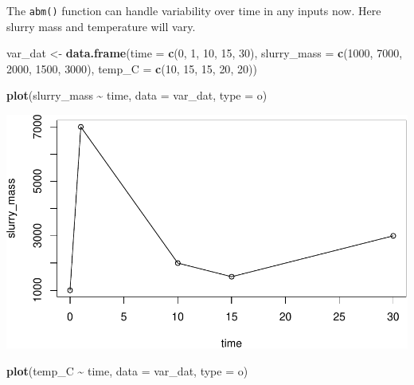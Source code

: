 \documentclass[
]{article}
\newenvironment{Shaded}{\begin{snugshade}}{\end{snugshade}}
\newcommand{\AttributeTok}[1]{\textcolor[rgb]{0.13,0.29,0.53}{#1}}
\newcommand{\DecValTok}[1]{\textcolor[rgb]{0.00,0.00,0.81}{#1}}
\newcommand{\FunctionTok}[1]{\textcolor[rgb]{0.13,0.29,0.53}{\textbf{#1}}}
\newcommand{\NormalTok}[1]{#1}
\newcommand{\OtherTok}[1]{\textcolor[rgb]{0.56,0.35,0.01}{#1}}
\newcommand{\SpecialCharTok}[1]{\textcolor[rgb]{0.81,0.36,0.00}{\textbf{#1}}}
\newcommand{\StringTok}[1]{\textcolor[rgb]{0.31,0.60,0.02}{#1}}
\begin{document}
The \texttt{abm()} function can handle variability over time in any
inputs now. Here slurry mass and temperature will vary.

\begin{Shaded}
\begin{Highlighting}[]
\NormalTok{var\_dat }\OtherTok{\textless{}{-}} \FunctionTok{data.frame}\NormalTok{(}\AttributeTok{time =} \FunctionTok{c}\NormalTok{(}\DecValTok{0}\NormalTok{, }\DecValTok{1}\NormalTok{, }\DecValTok{10}\NormalTok{, }\DecValTok{15}\NormalTok{, }\DecValTok{30}\NormalTok{), }
                      \AttributeTok{slurry\_mass =} \FunctionTok{c}\NormalTok{(}\DecValTok{1000}\NormalTok{, }\DecValTok{7000}\NormalTok{, }\DecValTok{2000}\NormalTok{, }\DecValTok{1500}\NormalTok{, }\DecValTok{3000}\NormalTok{),}
                      \AttributeTok{temp\_C =} \FunctionTok{c}\NormalTok{(}\DecValTok{10}\NormalTok{, }\DecValTok{15}\NormalTok{, }\DecValTok{15}\NormalTok{, }\DecValTok{20}\NormalTok{, }\DecValTok{20}\NormalTok{))}

\FunctionTok{plot}\NormalTok{(slurry\_mass }\SpecialCharTok{\textasciitilde{}}\NormalTok{ time, }\AttributeTok{data =}\NormalTok{ var\_dat, }\AttributeTok{type =} \StringTok{\textquotesingle{}o\textquotesingle{}}\NormalTok{)}
\end{Highlighting}
\end{Shaded}

\includegraphics{simple_demo_files/figure-latex/unnamed-chunk-14-1.pdf}

\begin{Shaded}
\begin{Highlighting}[]
\FunctionTok{plot}\NormalTok{(temp\_C }\SpecialCharTok{\textasciitilde{}}\NormalTok{ time, }\AttributeTok{data =}\NormalTok{ var\_dat, }\AttributeTok{type =} \StringTok{\textquotesingle{}o\textquotesingle{}}\NormalTok{)}
\end{Highlighting}
\end{Shaded}
\end{document}
